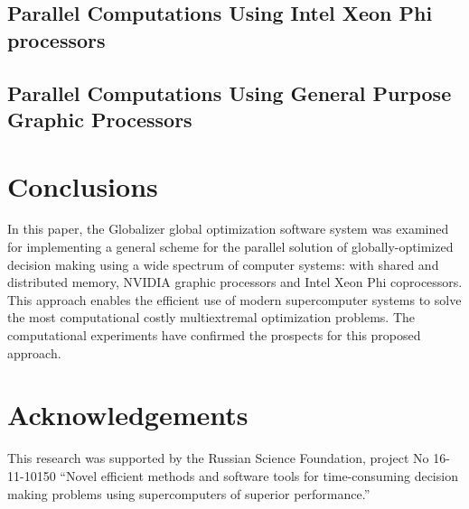 \documentclass{gOMS2e}
\theoremstyle{plain}%
\theoremstyle{definition}
\theoremstyle{remark}
\begin{document}
\subsection{Parallel Computations Using Intel Xeon Phi processors}
\subsection{Parallel Computations Using General Purpose Graphic Processors}

\section{Conclusions}
\label{sec:concl}
In this paper, the Globalizer global optimization software system was examined for
implementing a general scheme for the parallel solution of globally-optimized decision
making using a wide spectrum of computer systems: with shared and distributed memory,
NVIDIA graphic processors and Intel Xeon Phi coprocessors. This approach enables the
efficient use of modern supercomputer systems to solve the most computational costly
multiextremal optimization problems. The computational experiments have confirmed the
prospects for this proposed approach.

\section*{Acknowledgements}
This research was supported by the Russian Science Foundation, project No 16-11-10150
``Novel efficient methods and software tools for time-consuming decision making problems using supercomputers of superior performance.''
\end{document}
